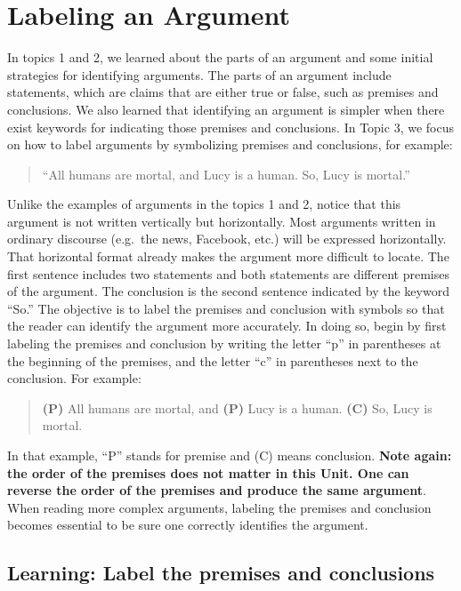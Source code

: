 \documentclass[
]{book}
\begin{document}
\hypertarget{labeling-an-argument}{%
\section{Labeling an Argument}\label{labeling-an-argument}}

In topics 1 and 2, we learned about the parts of an argument and some initial strategies for identifying arguments. The parts of an argument include statements, which are claims that are either true or false, such as premises and conclusions. We also learned that identifying an argument is simpler when there exist keywords for indicating those premises and conclusions. In Topic 3, we focus on how to label arguments by symbolizing premises and conclusions, for example:

\begin{quote}
``All humans are mortal, and Lucy is a human. So, Lucy is mortal.''
\end{quote}

Unlike the examples of arguments in the topics 1 and 2, notice that this argument is not written vertically but horizontally. Most arguments written in ordinary discourse (e.g.~the news, Facebook, etc.) will be expressed horizontally. That horizontal format already makes the argument more difficult to locate. The first sentence includes two statements and both statements are different premises of the argument. The conclusion is the second sentence indicated by the keyword ``So.'' The objective is to label the premises and conclusion with symbols so that the reader can identify the argument more accurately. In doing so, begin by first labeling the premises and conclusion by writing the letter ``p'' in parentheses at the beginning of the premises, and the letter ``c'' in parentheses next to the conclusion. For example:

\begin{quote}
\textbf{(P)} All humans are mortal, and \textbf{(P)} Lucy is a human. \textbf{(C)} So, Lucy is mortal.
\end{quote}

In that example, ``P'' stands for premise and (C) means conclusion. \textbf{Note again: the order of the premises does not matter in this Unit. One can reverse the order of the premises and produce the same argument}. When reading more complex arguments, labeling the premises and conclusion becomes essential to be sure one correctly identifies the argument.

\hypertarget{learning-label-the-premises-and-conclusions}{%
\subsection*{Learning: Label the premises and conclusions}\label{learning-label-the-premises-and-conclusions}}
\end{document}
